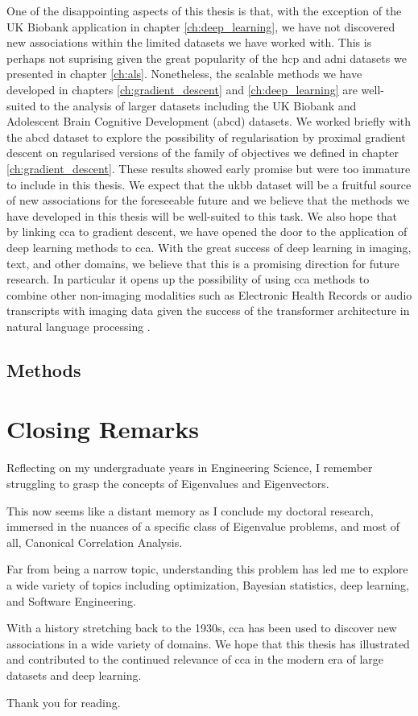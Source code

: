 One of the disappointing aspects of this thesis is that, with the exception of the UK Biobank application in chapter \ref{ch:deep_learning}, we have not discovered new associations within the limited datasets we have worked with.
This is perhaps not suprising given the great popularity of the \acrshort{hcp} and \acrshort{adni} datasets we presented in chapter \ref{ch:als}.
Nonetheless, the scalable methods we have developed in chapters \ref{ch:gradient_descent} and \ref{ch:deep_learning} are well-suited to the analysis of larger datasets including the UK Biobank and Adolescent Brain Cognitive Development (\acrshort{abcd}) datasets.
We worked briefly with the \acrshort{abcd} dataset to explore the possibility of regularisation by proximal gradient descent on regularised versions of the family of objectives we defined in chapter \ref{ch:gradient_descent}.
These results showed early promise but were too immature to include in this thesis.
We expect that the \acrshort{ukbb} dataset will be a fruitful source of new associations for the foreseeable future and we believe that the methods we have developed in this thesis will be well-suited to this task.
We also hope that by linking \acrshort{cca} to gradient descent, we have opened the door to the application of deep learning methods to \acrshort{cca}.
With the great success of deep learning in imaging, text, and other domains, we believe that this is a promising direction for future research.
In particular it opens up the possibility of using \acrshort{cca} methods to combine other non-imaging modalities such as Electronic Health Records or audio transcripts with imaging data given the success of the transformer architecture in natural language processing \citep{vaswani2017attention}.

\subsection{Methods}




\section{Closing Remarks}

Reflecting on my undergraduate years in Engineering Science, I remember struggling to grasp the concepts of Eigenvalues and Eigenvectors.

This now seems like a distant memory as I conclude my doctoral research, immersed in the nuances of a specific class of Eigenvalue problems, and most of all, Canonical Correlation Analysis.

Far from being a narrow topic, understanding this problem has led me to explore a wide variety of topics including optimization, Bayesian statistics, deep learning, and Software Engineering.

With a history stretching back to the 1930s, \acrshort{cca} has been used to discover new associations in a wide variety of domains.
We hope that this thesis has illustrated and contributed to the continued relevance of \acrshort{cca} in the modern era of large datasets and deep learning.

Thank you for reading.
